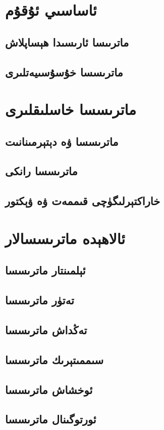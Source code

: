 
\section{ئاساسىي ئۇقۇم}
\subsection{ماترىىسا ئارىسىدا ھېساپلاش}
\subsection{ماترىسسا خۇسۇسىيەتلىرى}

\section{ماترىسسا خاسلىقلىرى}
\subsection{ماترىسسا ۋە دېتېرمىنانىت}
\subsection{ماترىسسا رانكى}
\subsection{خاراكتېرلىگۈچى قىممەت ۋە ۋېكتور}


\section{ئالاھېدە ماترىسسالار}
\subsection{ئېلمىنتار ماترىسسا}
\subsection{تەتۈر ماترىسسا}
\subsection{تەڭداش ماترىسسا}
\subsection{سىممىتېرىك ماترىسسا}
\subsection{ئوخشاش ماترىسسا}
\subsection{ئورتوگىنال ماترىسسا}

